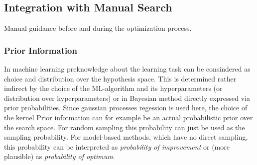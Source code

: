 \documentclass[english]{article}
\begin{document}
\subsection{Integration with Manual Search}
Manual guidance before and during the optimization process.

\subsubsection{Prior Information}
In machine learning preknowledge about the learning task can be consindered as choice and distribution over the hypothesis space. This is determined rather indirect by the choice of the \ac{ML}-algorithm and its hyperparameters (or distribution over hyperparameters) or in Bayesian method directly expressed via prior probabilities. Since gaussian processes regession is used here, the choice of the kernel
Prior infotmation can for example be an actual probabilistic prior over the search space. For random sampling this probability can just be used as the sampling probability. For model-based methods, which have no direct sampling, this probability can be interpreted as \textit{probability of improvement} or (more plausible) as \textit{probability of optimum}.
\end{document}
